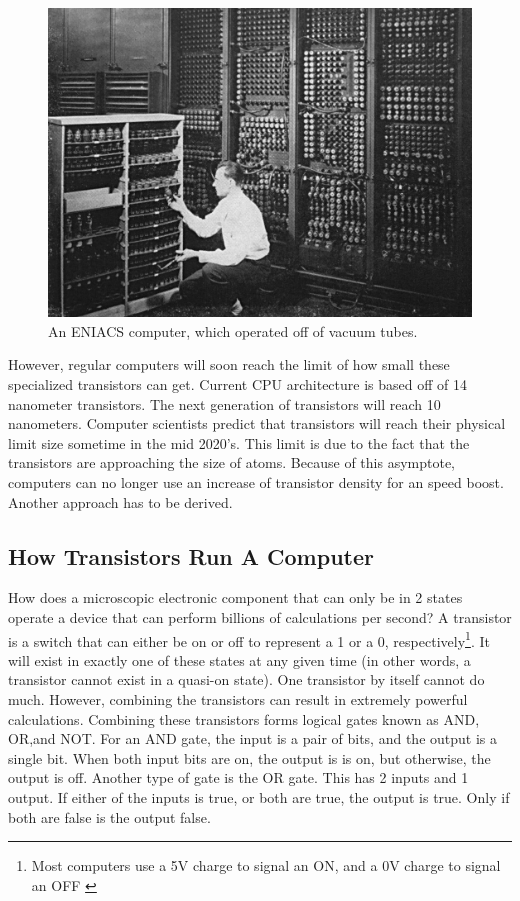 \documentclass[10pt,journal,compsoc]{IEEEtran}
\begin{document}
\begin{figure}
	\centering
	\includegraphics[width=0.7\linewidth]{eniacsvacuum}
	\caption[]{An ENIACS computer, which operated off of vacuum tubes\cite{ENIACS}.}
	\label{fig:eniacsvacuum}
\end{figure}


However, regular computers will soon reach the limit of how small these specialized transistors can get. Current CPU architecture is based off of 14 nanometer transistors. The next generation of transistors will reach 10 nanometers. \cite{Intel}
 Computer scientists predict that transistors will reach their physical limit size sometime in the mid 2020's. This limit is due to the fact that the transistors are approaching the size of atoms\cite{ARSTech}. Because of this asymptote, computers can no longer use an increase of transistor density for an speed boost. Another approach has to be derived. 


\subsection{How Transistors Run A Computer}
How does a microscopic electronic component that can only be in 2 states operate a device that can perform billions of calculations per second? A transistor is a switch that can either be on or off to represent a 1 or a 0, respectively\footnote{Most computers use a 5V charge to signal an ON, and a 0V charge to signal an OFF \cite{Surrey}
}. It will exist in exactly one of these states at any given time (in other words, a transistor cannot exist in a quasi-on state). One transistor by itself cannot do much. However, combining the transistors can result in extremely powerful calculations. Combining these transistors forms logical gates known as AND, OR,and NOT.  For an AND gate, the input is a pair of bits, and the output is a single bit. When both input bits are on, the output is is on, but otherwise, the output is off. Another type of gate is the OR gate. This has 2 inputs and 1 output. If either of the inputs is true, or both are true, the output is true. Only if both are false is the output false. 
\end{document}
